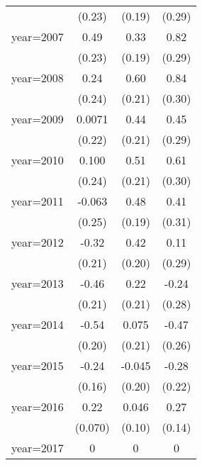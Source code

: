 \begin{sidewaystable}[htbp]
\begin{tabular}{l*{3}{c}}
                &   (0.23)         &   (0.19)         &   (0.29)         \\
\addlinespace
year=2007       &     0.49\sym{**} &     0.33\sym{*}  &     0.82\sym{***}\\
                &   (0.23)         &   (0.19)         &   (0.29)         \\
\addlinespace
year=2008       &     0.24         &     0.60\sym{***}&     0.84\sym{***}\\
                &   (0.24)         &   (0.21)         &   (0.30)         \\
\addlinespace
year=2009       &   0.0071         &     0.44\sym{**} &     0.45         \\
                &   (0.22)         &   (0.21)         &   (0.29)         \\
\addlinespace
year=2010       &    0.100         &     0.51\sym{**} &     0.61\sym{**} \\
                &   (0.24)         &   (0.21)         &   (0.30)         \\
\addlinespace
year=2011       &   -0.063         &     0.48\sym{**} &     0.41         \\
                &   (0.25)         &   (0.19)         &   (0.31)         \\
\addlinespace
year=2012       &    -0.32         &     0.42\sym{**} &     0.11         \\
                &   (0.21)         &   (0.20)         &   (0.29)         \\
\addlinespace
year=2013       &    -0.46\sym{**} &     0.22         &    -0.24         \\
                &   (0.21)         &   (0.21)         &   (0.28)         \\
\addlinespace
year=2014       &    -0.54\sym{***}&    0.075         &    -0.47\sym{*}  \\
                &   (0.20)         &   (0.21)         &   (0.26)         \\
\addlinespace
year=2015       &    -0.24         &   -0.045         &    -0.28         \\
                &   (0.16)         &   (0.20)         &   (0.22)         \\
\addlinespace
year=2016       &     0.22\sym{***}&    0.046         &     0.27\sym{*}  \\
                &  (0.070)         &   (0.10)         &   (0.14)         \\
\addlinespace
year=2017       &        0         &        0         &        0         \\

\end{tabular}
\end{sidewaystable}
